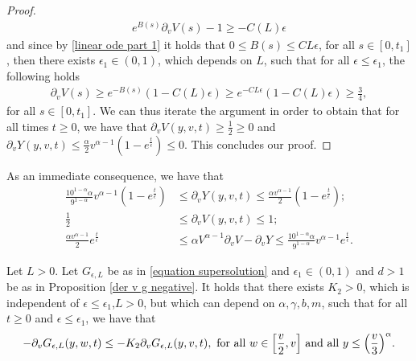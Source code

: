 \documentclass[11pt]{article}
\numberwithin{equation}{section}
\begin{document}
\begin{proof}
\begin{align*}
e^{B(s)}\partial_{v}V(s)-1\geq -C(L)\epsilon
\end{align*}
and since by \eqref{linear ode part 1} it holds that $0\leq B(s)\leq CL\epsilon$, for all $s\in[0,t_{1}]$, then there exists $\epsilon_{1}\in(0,1)$, which depends on $L$, such that for all $\epsilon\leq \epsilon_{1}$, the following holds
\begin{align*}
    \partial_{v}V(s)\geq e^{-B(s)}(1-C(L)\epsilon)\geq e^{-CL\epsilon}(1-C(L)\epsilon)\geq \frac{3}{4},
\end{align*}
for all $s\in[0,t_{1}]$. We can thus iterate the argument in order to obtain that for all times $t\geq 0$, we have that $\partial_{v}V(y,v,t)\geq \frac{1}{2} \geq 0$ and $\partial_{v}Y(y,v,t)\leq \frac{\alpha}{2}v^{\alpha-1}(1-e^{\frac{t}{\epsilon}})\leq 0$. This concludes our proof.
 \end{proof}
 \begin{rmk}\label{bounds on the derivatives remark}
    As an immediate consequence, we have that
    \begin{align*}
        \frac{10^{1-\alpha}\alpha}{9^{1-\alpha}} v^{\alpha-1}(1-e^{\frac{t}{\epsilon}})&\leq \partial_{v}Y(y,v,t)\leq \frac{\alpha v^{\alpha-1}}{2}(1-e^{\frac{t}{\epsilon}});\\
        \frac{1}{2}&\leq \partial_{v}V(y,v,t)\leq 1;\\
    \frac{\alpha v^{\alpha-1}}{2}e^{\frac{t}{\epsilon}}&\leq    \alpha V^{\alpha-1}\partial_{v}{V}-\partial_{v}Y\leq  \frac{10^{1-\alpha}\alpha}{9^{1-\alpha}} v^{\alpha-1}e^{\frac{t}{\epsilon}}.
    \end{align*}
 \end{rmk}
 \begin{prop}\label{bounds derivative prop}
Let $L>0$. Let $G_{\epsilon,L}$ be as in \eqref{equation supersolution} and $\epsilon_{1}\in(0,1)$ and $d>1$ be as in Proposition \ref{der v g negative}. It holds that there exists $K_{2}>0$, which is independent of $\epsilon\leq \epsilon_{1}$,$L>0$, but which can depend on $\alpha,\gamma,b,m$, such that for all $t\geq 0$ and $\epsilon\leq\epsilon_{1}$, we have that
 \begin{align*}
    -\partial_{v}G_{\epsilon,L}(y,w,t)\leq -K_{2} \partial_{v}G_{\epsilon,L}(y,v,t), \textup{ for all } w\in\Big[\frac{v}{2},v\Big] \textup{ and all } y\leq \Big(\frac{v}{3}\Big)^{\alpha}.
 \end{align*}
 \end{prop}
\end{document}
